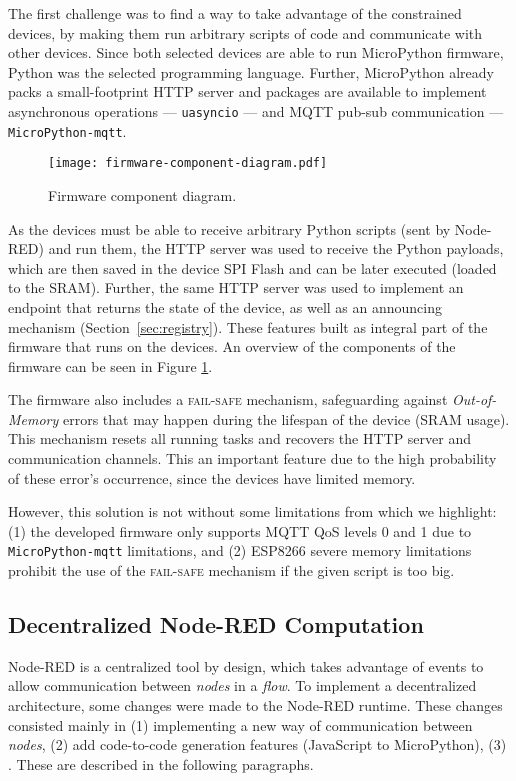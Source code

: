 The first challenge was to find a way to take advantage of the constrained devices, by making them run arbitrary scripts of code and communicate with other devices. Since both selected devices are able to run MicroPython firmware, Python was the selected programming language. Further, MicroPython already packs a small-footprint HTTP server and packages are available to implement asynchronous operations --- \ie \texttt{uasyncio} --- and MQTT pub-sub communication --- \ie \texttt{MicroPython-mqtt}.

\begin{figure}[h]
    \centering
    \texttt{[image: firmware-component-diagram.pdf]}
    \caption{Firmware component diagram.}
    \label{fig:firmware_component_diagram}
\end{figure}

As the devices must be able to receive arbitrary Python scripts (sent by Node-RED) and run them, the HTTP server was used to receive the Python payloads, which are then saved in the device SPI Flash and can be later executed (loaded to the SRAM). Further, the same HTTP server was used to implement an endpoint that returns the state of the device, as well as an announcing mechanism (\cf Section~\ref{sec:registry}). These features built as integral part of the firmware that runs on the devices. An overview of the components of the firmware can be seen in Figure \ref{fig:firmware_component_diagram}.

The firmware also includes a \textsc{fail-safe} mechanism, safeguarding against \textit{Out-of-Memory} errors that may happen during the lifespan of the device (SRAM usage). This mechanism resets all running tasks and recovers the HTTP server and communication channels. This an important feature due to the high probability of these error's occurrence, since the devices have limited memory. 

However, this solution is not without some limitations from which we highlight: (1) the developed firmware only supports MQTT QoS levels 0 and 1 due to \texttt{MicroPython-mqtt} limitations, and (2) ESP8266 severe memory limitations prohibit the use of the \textsc{fail-safe} mechanism if the given script is too big.

\subsection{Decentralized Node-RED Computation}\label{sec:node_red_decentralization}

Node-RED is a centralized tool by design, which takes advantage of events to allow communication between \textit{nodes} in a \textit{flow}. To implement a decentralized architecture, some changes were made to the Node-RED runtime. These changes consisted mainly in (1) implementing a new way of communication between \textit{nodes}, (2) add code-to-code generation features (\ie JavaScript to MicroPython), (3) . These are described in the following paragraphs.


